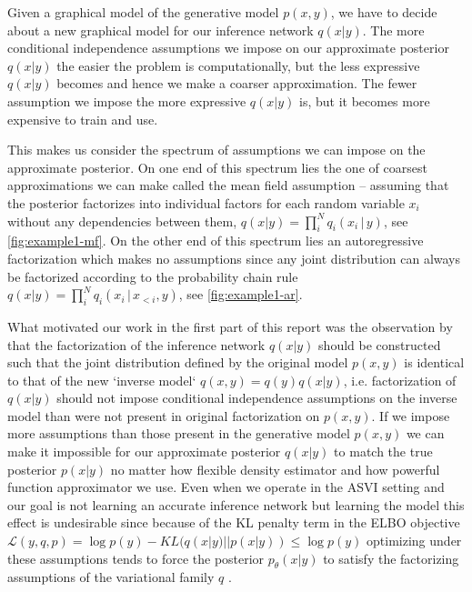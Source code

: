 \documentclass[12pt]{article}
\begin{document}
Given a graphical model of the generative model $p(x,y)$, 
we have to decide about a new graphical model for our inference network $q(x|y)$. 
The more conditional independence assumptions we impose on our approximate posterior $q(x|y)$ the easier the problem is computationally, but the less expressive $q(x|y)$ becomes and hence we make a coarser approximation.
The fewer assumption we impose the more expressive $q(x|y)$ is, but it becomes more expensive to train and use.

This makes us consider the spectrum of assumptions we can impose on the approximate posterior.
On one end of this spectrum lies the one of coarsest approximations we can make called the mean field assumption -- assuming that the posterior factorizes into individual factors for each random variable $x_i$ without any dependencies between them, $q(x|y)=\prod^N_iq_i(x_i\,|\,y)$, see \autoref{fig:example1-mf}.
On the other end of this spectrum lies an autoregressive factorization which makes no assumptions since any joint distribution can always be factorized according to the probability chain rule $q(x|y)=\prod^N_iq_i(x_i\,|\,x_{<i},y)$, see \autoref{fig:example1-ar}.

What motivated our work in the first part of this report was the observation by \citet{StuhlmullerEtAl2013} that
the factorization of the inference network $q(x|y)$ should be constructed such that the joint distribution defined by the original model $p(x, y)$ is identical to that of the new `inverse model` $q(x, y) = q(y)q(x|y)$, i.e. factorization of $q(x|y)$ should not impose conditional independence assumptions on the inverse model than were not present in original factorization on $p(x,y)$.
If we impose more assumptions than those present in the generative model $p(x,y)$ we can make it impossible for our approximate posterior $q(x|y)$ to match the true posterior $p(x|y)$ no matter how flexible density estimator and how powerful function approximator we use.
Even when we operate in the ASVI setting and our goal is not learning an accurate inference network but learning the model this effect is undesirable
since because of the KL penalty term in the ELBO objective
$\mathcal{L}(y,q,p)=\log p(y)-KL(q(x|y) || p(x|y)) \le \log p(y)$ \citep{VAE}
optimizing under these assumptions tends to force the posterior $p_\theta(x|y)$ to satisfy the factorizing assumptions of the variational family $q$ \citep{FIVO}.
\end{document}
